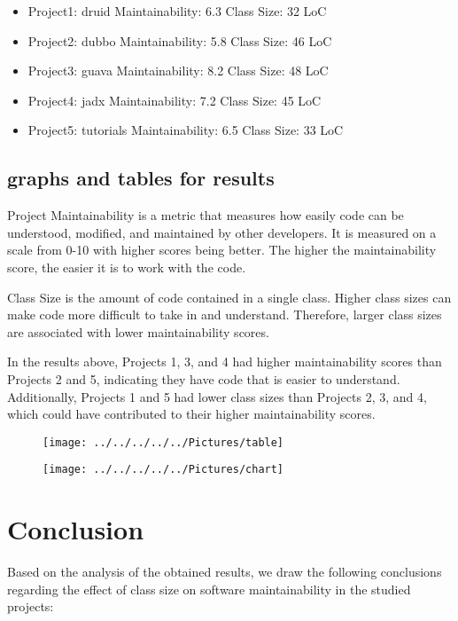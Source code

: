 \documentclass[conference]{IEEEtran}
\begin{document}
	
	\begin{itemize}
		\item Project1: druid
		Maintainability: 6.3
		Class Size: 32 LoC
		
		\item Project2: dubbo
		Maintainability: 5.8
		Class Size: 46 LoC
		
		\item Project3: guava
		Maintainability: 8.2
		Class Size: 48 LoC
		
		\item Project4: jadx
		Maintainability: 7.2
		Class Size: 45 LoC
		
		\item Project5: tutorials
		Maintainability: 6.5
		Class Size: 33 LoC
	\end{itemize}
	\subsection{graphs and tables for results }
	Project Maintainability is a metric that measures how easily code can be understood, modified, and maintained by other developers. It is measured on a scale from 0-10 with higher scores being better. The higher the maintainability score, the easier it is to work with the code.
	
	Class Size is the amount of code contained in a single class. Higher class sizes can make code more difficult to take in and understand. Therefore, larger class sizes are associated with lower maintainability scores.
	
	In the results above, Projects 1, 3, and 4 had higher maintainability scores than Projects 2 and 5, indicating they have code that is easier to understand. Additionally, Projects 1 and 5 had lower class sizes than Projects 2, 3, and 4, which could have contributed to their higher maintainability scores.
	\begin{figure}
		\centering
		\texttt{[image: ../../../../../Pictures/table]}
		\caption{}
		\label{fig:table}
	\end{figure}

	\begin{figure}
		\centering
		\texttt{[image: ../../../../../Pictures/chart]}
		\caption{}
		\label{fig:chart}
	\end{figure}
	\section{Conclusion}
	Based on the analysis of the obtained results, we draw the following conclusions regarding the effect of class size on software maintainability in the studied projects:
	
\end{document}
